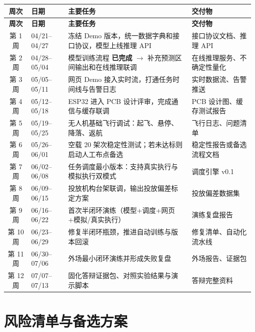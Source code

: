 \documentclass[12pt,a4paper,openany]{ctexrep}
\begin{document}
\begin{longtable}{cl p{6cm} p{4cm}}
\toprule
\textbf{周次} & \textbf{日期} & \textbf{主要任务} & \textbf{交付物} \\
\midrule
\endfirsthead
\toprule
\textbf{周次} & \textbf{日期} & \textbf{主要任务} & \textbf{交付物} \\
\midrule
\endhead
\bottomrule
\endlastfoot
第 1 周 & 04/21--04/27 & 冻结 Demo 版本，统一数据字典和接口协议，模型上线推理 API & 接口协议文档、推理 API \\
第 2 周 & 04/28--05/04 & 模型训练流程 \textcolor{green!60!black}{\textbf{已完成}} $\rightarrow$ 补充预测区间输出和在线推理联调 & 在线推理服务、不确定性量化 \\
第 3 周 & 05/05--05/11 & 网页 Demo 接入实时流，打通任务时间线与告警日志 & 实时数据流、告警推送 \\
第 4 周 & 05/12--05/18 & ESP32 进入 PCB 设计评审，完成通信与缓存联调 & PCB 设计图、缓存测试报告 \\
第 5 周 & 05/19--05/25 & 无人机基础飞行调试：起飞、悬停、降落、返航 & 飞行日志、问题清单 \\
第 6 周 & 05/26--06/01 & 空载 20 架次稳定性测试；若未达标则启动人工布点备选 & 稳定性报告或备选流程文档 \\
第 7 周 & 06/02--06/08 & 任务调度最小版本：支持真实执行与模拟执行双模式 & 调度引擎 v0.1 \\
第 8 周 & 06/09--06/15 & 投放机构台架联调，输出投放偏差标定方案 & 投放偏差数据集 \\
第 9 周 & 06/16--06/22 & 首次半闭环演练（模型+调度+网页+模拟/真实执行） & 演练复盘报告 \\
第 10 周 & 06/23--06/29 & 修复半闭环瓶颈，推进自动训练与版本回滚 & 修复清单、自动化流水线 \\
第 11 周 & 06/30--07/06 & 外场最小闭环演练并形成失败复盘 & 外场报告、证据包 \\
第 12 周 & 07/07--07/13 & 固化答辩证据包、对照实验结果与演示脚本 & 答辩完整资料 \\
\end{longtable}

\chapter{风险清单与备选方案}
\end{document}
